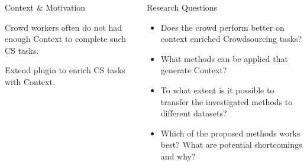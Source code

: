 \documentclass[final,hyperref={pdfpagelabels=true}]{beamer}
\begin{document}
\begin{frame}
\begin{columns}[t, onlytextwidth]
\begin{column}{\textwidth}
\begin{columns}[t, onlytextwidth]
\begin{column}{.49\linewidth}
\begin{block}{Context \& Motivation}
\begin{minipage}{.45\linewidth}
						{\color{BeamerBlue}{Problem:}} Crowd workers often do not had enough Context to complete such CS tasks.
						\vspace{1.5cm}
						
						{\color{BeamerBlue}{Solution:}} Extend plugin to enrich CS tasks with Context.
						\vspace{1.5cm}
					\end{minipage}
					\hfill
				\end{block}
			\end{column}
			
			\begin{column}{.49\linewidth}
				\begin{block}{Research Questions}
					    \begin{itemize}
							\setlength\itemsep{1.5cm}
					    	\item \textsc{\color{BeamerBlue}{Context Enrichment of Crowdsourcing Tasks}}
							
							Does the crowd perform better on context enriched Crowdsourcing tasks?
					    	\item \textsc{\color{BeamerBlue}{Context Enrichment Methods}}
							
							What methods can be applied that generate Context?
					    	\item \textsc{\color{BeamerBlue}{Generalising the Applicability of the proposed Methods}}
							
							To what extent is it possible to transfer the investigated methods to different datasets?
					    	\item \textsc{\color{BeamerBlue}{Comparative Evaluation of the proposed Methods}}
							
							Which of the proposed methods works best? What are potential shortcomings and why?
					    \end{itemize}
				\end{block}
			\end{column}
			
		\end{columns}
		

\end{column}
\end{columns}
\end{frame}
\end{document}

